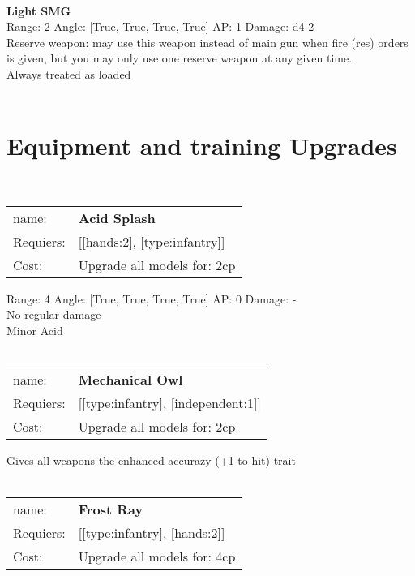 \ \\
{\bf Light SMG } \\



Range: 2  Angle: [True, True, True, True] AP: 1 Damage: d4-2 \\
Reserve weapon: may use this weapon instead of main gun when fire (res) orders is given, but you may only use one reserve weapon at any given time.\\ 
Always treated as loaded\\ 




 
\ \\

\section{Equipment and training Upgrades}\ \\
\begin{tabular}{ll}
name: & {\bf Acid Splash } \\
Requiers: & [[hands:2], [type:infantry]] \\
Cost: & Upgrade all models for: 2cp \\
\end{tabular}



Range: 4  Angle: [True, True, True, True] AP: 0 Damage: - \\
No regular damage\\ 
Minor Acid\\ 








\ \\
\begin{tabular}{ll}
name: & {\bf Mechanical Owl } \\
Requiers: & [[type:infantry], [independent:1]] \\
Cost: & Upgrade all models for: 2cp \\
\end{tabular}

Gives all weapons the enhanced accurazy (+1 to hit) trait\\ 









\ \\
\begin{tabular}{ll}
name: & {\bf Frost Ray } \\
Requiers: & [[type:infantry], [hands:2]] \\
Cost: & Upgrade all models for: 4cp \\
\end{tabular}



